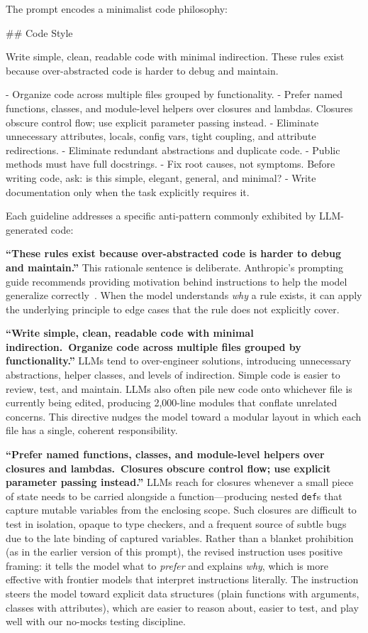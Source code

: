 \documentclass{article}
\begin{document}
The prompt encodes a minimalist code philosophy:

\begin{prompt}
## Code Style

Write simple, clean, readable code with minimal
indirection. These rules exist because over-abstracted
code is harder to debug and maintain.

- Organize code across multiple files grouped by
  functionality.
- Prefer named functions, classes, and module-level
  helpers over closures and lambdas. Closures obscure
  control flow; use explicit parameter passing instead.
- Eliminate unnecessary attributes, locals, config vars,
  tight coupling, and attribute redirections.
- Eliminate redundant abstractions and duplicate code.
- Public methods must have full docstrings.
- Fix root causes, not symptoms. Before writing code,
  ask: is this simple, elegant, general, and minimal?
- Write documentation only when the task explicitly
  requires it.
\end{prompt}

\noindent Each guideline addresses a specific anti-pattern commonly
exhibited by LLM-generated code:

\textbf{``These rules exist because over-abstracted code is harder to debug and maintain.''}  This rationale sentence is deliberate.  Anthropic's prompting guide recommends providing motivation behind instructions to help the model generalize correctly~\citep{anthropic2025prompting}.  When the model understands \emph{why} a rule exists, it can apply the underlying principle to edge cases that the rule does not explicitly cover.

\textbf{``Write simple, clean, readable code with minimal indirection.\ Organize code across multiple files grouped by functionality.''}  LLMs tend to over-engineer solutions, introducing unnecessary abstractions, helper classes, and levels of indirection.  Simple code is easier to review, test, and maintain.  LLMs also often pile new code onto whichever file is currently being edited, producing 2,000-line modules that conflate unrelated concerns.  This directive nudges the model toward a modular layout in which each file has a single, coherent responsibility.

\textbf{``Prefer named functions, classes, and module-level helpers over closures and lambdas.\ Closures obscure control flow; use explicit parameter passing instead.''}  LLMs reach for closures whenever a small piece of state needs to be carried alongside a function---producing nested \texttt{def}s that capture mutable variables from the enclosing scope.  Such closures are difficult to test in isolation, opaque to type checkers, and a frequent source of subtle bugs due to the late binding of captured variables.  Rather than a blanket prohibition (as in the earlier version of this prompt), the revised instruction uses positive framing: it tells the model what to \emph{prefer} and explains \emph{why}, which is more effective with frontier models that interpret instructions literally.  The instruction steers the model toward explicit data structures (plain functions with arguments, classes with attributes), which are easier to reason about, easier to test, and play well with our no-mocks testing discipline.
\end{document}

